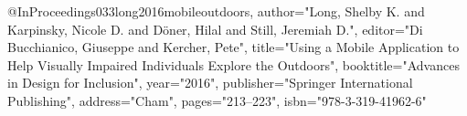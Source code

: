 @InProceedings{033long2016mobileoutdoors,
author="Long, Shelby K.
and Karpinsky, Nicole D.
and D{\"o}ner, Hilal
and Still, Jeremiah D.",
editor="Di Bucchianico, Giuseppe
and Kercher, Pete",
title="Using a Mobile Application to Help Visually Impaired Individuals Explore the Outdoors",
booktitle="Advances in Design for Inclusion",
year="2016",
publisher="Springer International Publishing",
address="Cham",
pages="213--223",
isbn="978-3-319-41962-6"
}